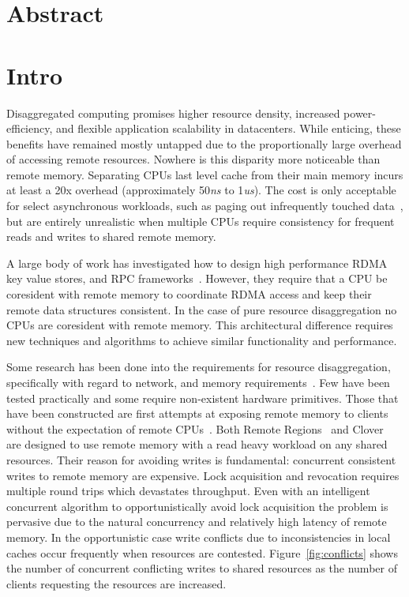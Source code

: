 \section{Abstract}

\section{Intro}
\label{sec:intro}

Disaggregated computing promises higher resource density, increased
power-efficiency, and flexible application scalability in datacenters.
While enticing, these benefits have remained mostly untapped due to
the proportionally large overhead of accessing remote resources.
Nowhere is this disparity more noticeable than remote memory.
Separating CPUs last level cache from their main memory incurs at
least a 20x overhead (approximately 50\textit{ns} to 1\textit{us}).
The cost is only acceptable for select asynchronous workloads, such as
paging out infrequently touched data~\cite{infiniswap,legoos,leap},
but are entirely unrealistic when multiple CPUs require consistency
for frequent reads and writes to shared remote memory.

A large body of work has investigated how to design high performance
RDMA key value stores, and RPC
frameworks~\cite{cell,sonuma,storm,farm,herd,erpc}. However, they
require that a CPU be coresident with remote memory to coordinate RDMA
access and keep their remote data structures consistent. In the case
of pure resource disaggregation no CPUs are coresident with remote
memory. This architectural difference requires new techniques and
algorithms to achieve similar functionality and performance. 

Some research has been done into the requirements for resource
disaggregation, specifically with regard to network, and memory
requirements~\cite{requirements, aguilera2019designing, disandapp,
amanda-hotnets}. Few have been tested practically and some require
non-existent hardware primitives. Those that have been constructed are
first attempts at exposing remote memory to clients without the
expectation of remote CPUs~\cite{reigons, clover}. Both Remote
Regions~\cite{reigons} and Clover~\cite{clover} are designed to use
remote memory with a read heavy workload on any shared resources.
Their reason for avoiding writes is fundamental: concurrent consistent
writes to remote memory are expensive. Lock acquisition and revocation
requires multiple round trips which devastates throughput.  Even with
an intelligent concurrent algorithm to opportunistically avoid lock
acquisition the problem is pervasive due to the natural concurrency
and relatively high latency of remote memory.
In the opportunistic case write conflicts due to inconsistencies in
local caches occur frequently when resources are contested.
Figure~\ref{fig:conflicts} shows the number of concurrent conflicting
writes to shared resources as the number of clients requesting the
resources are increased.

